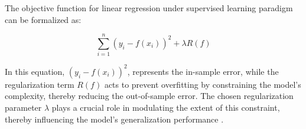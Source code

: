 The objective function for linear regression under  supervised learning paradigm can be formalized as:

\begin{equation}
\sum_{i=1}^{n} (y_i - f(x_i))^2 + \lambda R(f)
\end{equation}

In this equation, \( (y_i - f(x_i))^2 \), represents the in-sample error, while the regularization term \( R(f) \) acts to prevent overfitting by constraining the model's complexity, thereby reducing the out-of-sample error. The chosen regularization parameter \( \lambda \) plays a crucial role in modulating the extent of this constraint, thereby influencing the model's generalization performance \cite{TrevorHastieRobertTibshirani2014AssessmentSelection}.






